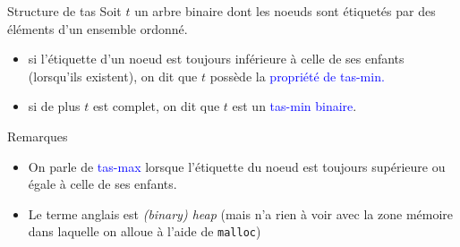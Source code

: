 \documentclass[10pt]{beamer}
\begin{document}
\begin{frame}[fragile]{\Ctitle}{\stitle}
	\begin{alertblock}{Structure de tas}
		Soit $t$ un arbre binaire dont les noeuds sont étiquetés par des éléments d'un ensemble ordonné.
		\begin{itemize}
			\item<2-> si l'étiquette d'un noeud est toujours inférieure à celle de ses enfants (lorsqu'ils existent), on dit que $t$ possède la \textcolor{blue}{propriété de tas-min.}
			\item<3-> si de plus $t$ est complet, on dit que $t$ est un \textcolor{blue}{tas-min binaire}.
		\end{itemize}
	\end{alertblock}
\end{frame}

\begin{frame}{\Ctitle}{\stitle}
	\begin{block}{Remarques}
		\begin{itemize}
			\item <1-> On parle de \textcolor{blue}{tas-max} lorsque l'étiquette du noeud est toujours supérieure ou égale à celle de ses enfants.
			\item <2-> Le terme anglais est \textit{(binary) heap} (mais n'a rien à voir avec la zone mémoire dans laquelle on alloue à l'aide de {\tt malloc})
		\end{itemize}
	\end{block}
\end{frame}
\end{document}
